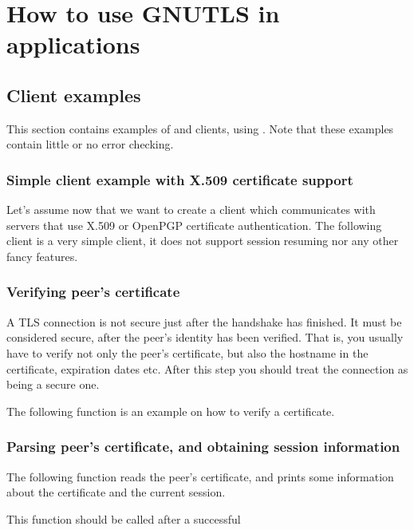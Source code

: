 \chapter{How to use GNUTLS in applications}
\label{examples}

\section{Client examples}
This section contains examples of \tls{} and \ssl{} clients, using \gnutls{}. 
Note that these examples contain little or no error checking.

\subsection{Simple client example with X.509 certificate support}
Let's assume now that we want to create a client which communicates
with servers that use X.509 or OpenPGP certificate authentication. The following client
is a very simple \tls{} client, it does not support session resuming nor
any other fancy features.


\subsection{Verifying peer's certificate}
\par A TLS connection is not secure just after the handshake has finished.
It must be considered secure, after the peer's identity has been
verified. That is, you usually have to verify not only the peer's 
certificate, but also the hostname in the certificate, expiration dates etc. 
After this step you should treat the connection as being a secure one.

\par
The following function is an example on how to verify a certificate.



\subsection{Parsing peer's certificate, and obtaining session information}
The following function reads the peer's certificate,
and prints some information about the certificate and the current session.
\par
This function should be called after a successful




